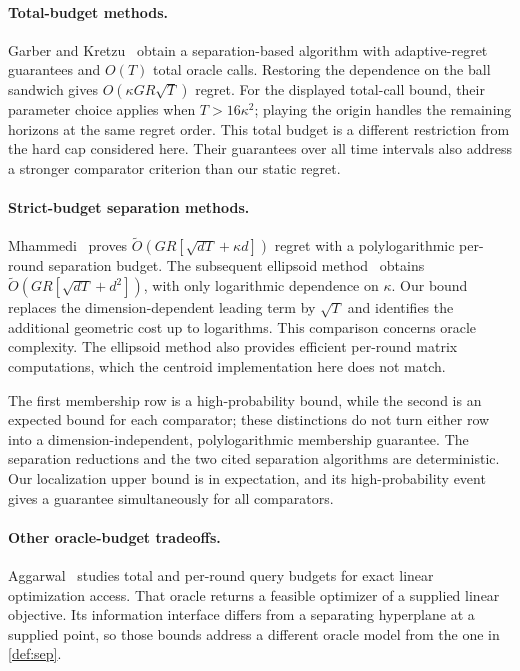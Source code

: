 \documentclass[11pt]{article}
\newcommand{\wtO}{\widetilde O}
\theoremstyle{definition}
\newcounter{algorithm}
\begin{document}
\paragraph{Total-budget methods.}
Garber and Kretzu~\cite[Theorem~14]{garberkretzu2022} obtain a separation-based
algorithm with adaptive-regret guarantees and $O(T)$ total oracle calls.
Restoring the dependence on the ball sandwich gives
$O(\kappa GR\sqrt T)$ regret. For the displayed total-call bound, their
parameter choice applies when $T>16\kappa^2$; playing the origin handles
the remaining horizons at the same regret order. This total budget is a
different restriction from the hard cap considered here. Their guarantees
over all time intervals also address a stronger comparator criterion than
our static regret.

\paragraph{Strict-budget separation methods.}
Mhammedi~\cite[Theorem~4.1]{mhammedi2025sep} proves
$\wtO(GR[\sqrt{dT}+\kappa d])$ regret with a polylogarithmic per-round
separation budget. The subsequent ellipsoid
method~\cite[Theorem~4.1]{mhammedi2025ellipsoid} obtains
$\wtO(GR[\sqrt{dT}+d^2])$, with only logarithmic dependence on $\kappa$.
Our bound replaces the dimension-dependent leading term by $\sqrt T$ and
identifies the additional geometric cost up to logarithms. This comparison
concerns oracle complexity. The ellipsoid method also provides efficient
per-round matrix computations, which the centroid implementation here does
not match.

The first membership row is a high-probability bound, while the second is an
expected bound for each comparator; these distinctions do not turn either
row into a dimension-independent, polylogarithmic membership guarantee.
The separation reductions and the two cited separation algorithms are
deterministic. Our localization upper bound is in expectation, and its
high-probability event gives a guarantee simultaneously for all comparators.

\paragraph{Other oracle-budget tradeoffs.}
Aggarwal~\cite{aggarwal2026} studies total and per-round query budgets for
exact linear optimization access. That oracle returns a feasible optimizer
of a supplied linear objective. Its information interface differs from a
separating hyperplane at a supplied point, so those bounds address a
different oracle model from the one in \cref{def:sep}.
\end{document}

